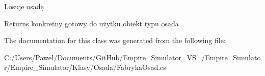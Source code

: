 Losuje osadę 

\begin{DoxyReturn}{Returns}
konkretny gotowy do użytku obiekt typu osada
\end{DoxyReturn}


The documentation for this class was generated from the following file\+:\begin{DoxyCompactItemize}
\item 
C\+:/\+Users/\+Paweł/\+Documents/\+Git\+Hub/\+Empire\+\_\+\+Simulator\+\_\+\+V\+S\+\_/\+Empire\+\_\+\+Simulator/\+Empire\+\_\+\+Simulator/\+Klasy/\+Osada/Fabryka\+Osad.\+cs\end{DoxyCompactItemize}
